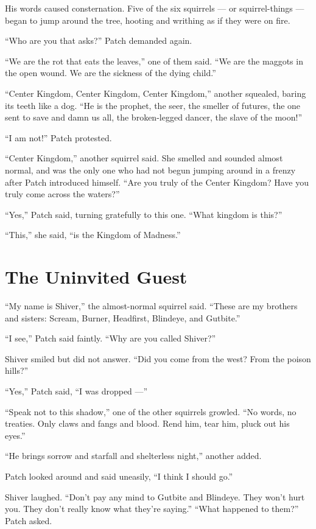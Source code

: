 \documentclass[ebook,oneside,openany,12pt]{memoir}
\begin{document}
His words caused consternation. Five of the six squirrels — or
squirrel-things — began to jump around the tree, hooting and writhing
as if they were on fire.

“Who are you that asks?” Patch demanded again.

“We are the rot that eats the leaves,” one of them said. “We are the
maggots in the open wound. We are the sickness of the dying child.”

“Center Kingdom, Center Kingdom, Center Kingdom,” another squealed,
baring its teeth like a dog. “He is the prophet, the seer, the smeller
of futures, the one sent to save and damn us all, the broken-legged
dancer, the slave of the moon!”

“I am not!” Patch protested.

“Center Kingdom,” another squirrel said. She smelled and sounded
almost normal, and was the only one who had not begun jumping around
in a frenzy after Patch introduced himself. “Are you truly of the
Center Kingdom? Have you truly come across the waters?”

“Yes,” Patch said, turning gratefully to this one. “What kingdom is
this?”

“This,” she said, “is the Kingdom of Madness.”


\section{The Uninvited Guest}

“My name is Shiver,” the almost-normal squirrel said. “These are my
brothers and sisters: Scream, Burner, Headfirst, Blindeye, and
Gutbite.”

“I see,” Patch said faintly. “Why are you called Shiver?”

Shiver smiled but did not answer. “Did you come from the west? From
the poison hills?”

“Yes,” Patch said, “I was dropped —”

“Speak not to this shadow,” one of the other squirrels growled. “No
words, no treaties. Only claws and fangs and blood. Rend him, tear
him, pluck out his eyes.”

“He brings sorrow and starfall and shelterless night,” another added.

Patch looked around and said uneasily, “I think I should go.”

Shiver laughed. “Don’t pay any mind to Gutbite and Blindeye. They
won’t hurt you. They don’t really know what they’re saying.” “What
happened to them?” Patch asked.
\end{document}
